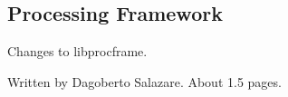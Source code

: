 \subsection*{Processing Framework}

Changes to libprocframe.

Written by Dagoberto Salazare. About 1.5 pages.
